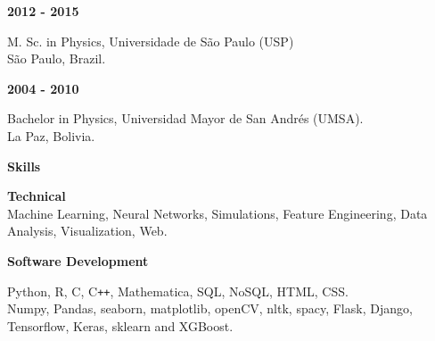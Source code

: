 \documentclass[a4paper,12pt,final]{memoir}
\newcommand{\SmallSep}{\vspace{0.5em}}
\newcommand{\CVSection}[1]
	{\Large\textbf{#1}\par
	\SmallSep\normalsize\normalfont}
\newcommand{\CVItem}[1]
	{\textbf{\color{RoyalBlue} #1}}
\begin{document}
\CVItem{2012 - 2015}\\
\begin{small}
M. Sc. in Physics, Universidade de S\~{a}o Paulo (USP)\\
S\~{a}o Paulo, Brazil.
\end{small}
\SmallSep

\CVItem{2004 - 2010}\\
\begin{small}
Bachelor in Physics, Universidad Mayor de San Andr\'{e}s (UMSA).\\
La Paz, Bolivia.
\end{small}

\SmallSep

\CVSection{Skills}


\CVItem{Technical}\\
{\small Machine Learning, Neural Networks, Simulations, Feature Engineering, Data Analysis, Visualization, Web.\\}
\vspace{-10pt}
\SmallSep

\CVItem{Software Development}\\
\begin{small}
Python, R, C, C\texttt{++}, Mathematica, SQL, NoSQL, HTML, CSS.\\
Numpy, Pandas, seaborn, matplotlib, openCV, nltk, spacy, Flask, Django, Tensorflow, Keras, sklearn and XGBoost.\\
\end{small}





\end{document}
